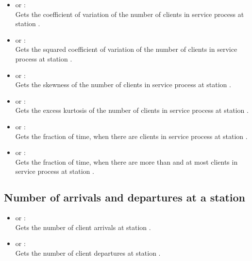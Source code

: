 \begin{itemize}
\item
{} or :\\
Gets the coefficient of variation of the number of clients in service process at station .

\item
{} or :\\
Gets the squared coefficient of variation of the number of clients in service process at station .

\item
{} or :\\
Gets the skewness of the number of clients in service process at station .

\item
{} or :\\
Gets the excess kurtosis of the number of clients in service process at station .

\item
{} or :\\
Gets the fraction of time, when there are  clients in service process at station .

\item
{} or :\\
Gets the fraction of time, when there are more than  and at most  clients in service process at station .

\end{itemize}  



\subsection{Number of arrivals and departures at a station}

\begin{itemize}

\item
{} or :\\
Gets the number of client arrivals at station .

\item
{} or :\\
Gets the number of client departures at station .

\end{itemize}  





